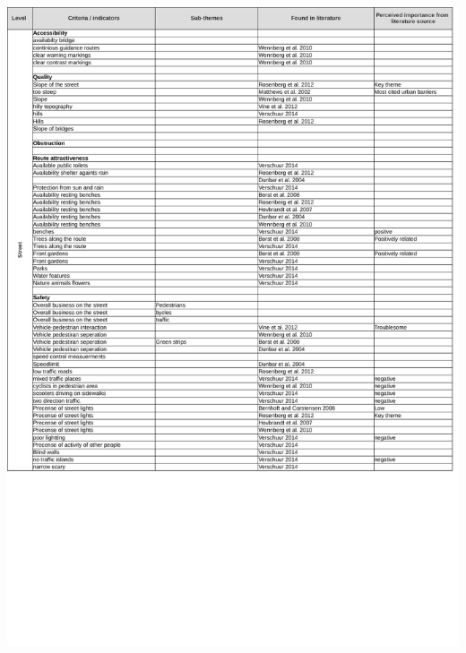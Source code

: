 \begin{appendix}
\includegraphics[width=\textwidth]{img/annex/A3_street_criteria.pdf}

\end{appendix}
